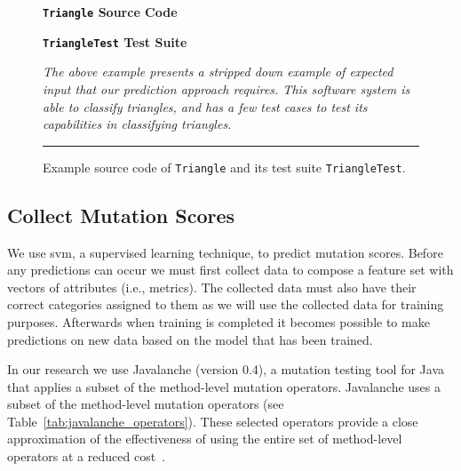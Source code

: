 \begin{figure}[!tb]
  \centering
  \begin{minipage}[t]{7.25cm}
  \centering
  \footnotesize{\textbf{\texttt{Triangle} Source Code}}
  
  \end{minipage}
  \hfill
  \begin{minipage}[t]{7.25cm}
  \centering
  \footnotesize{\textbf{\texttt{TriangleTest} Test Suite}}
  
  \end{minipage}
  \caption{Example source code of \texttt{Triangle} and its test suite \texttt{TriangleTest}.}
  \vspace{1mm}
  \footnotesize{\emph{The above example presents a stripped down example of expected input that our prediction approach requires. This software system is able to classify triangles, and has a few test cases to test its capabilities in classifying triangles.}}
  \vspace{2mm}
  \hrule
  \label{fig:triangle_example}
\end{figure}


\subsection{Collect Mutation Scores}
\label{subsec:approach_collect_mutation_scores}
We use \gls{svm}, a supervised learning technique, to predict mutation scores. Before any predictions can occur we must first collect data to compose a feature set with vectors of attributes (i.e., metrics). The collected data must also have their correct categories assigned to them as we will use the collected data for training purposes. Afterwards when training is completed it becomes possible to make predictions on new data based on the model that has been trained.

In our research we use Javalanche (version 0.4), a mutation testing tool for Java~\cite{SZ09} that applies a subset of the method-level mutation operators. Javalanche uses a subset of the method-level mutation operators (see Table~\ref{tab:javalanche_operators}). These selected operators provide a close approximation of the effectiveness of using the entire set of method-level operators at a reduced cost~\cite{OLR+96}.

